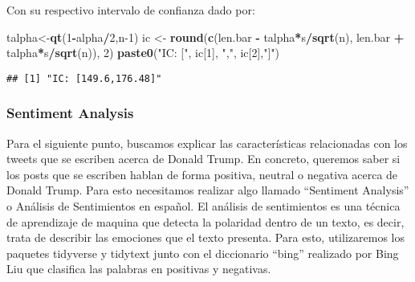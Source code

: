 \documentclass[
]{article}
\newenvironment{Shaded}{\begin{snugshade}}{\end{snugshade}}
\newcommand{\DecValTok}[1]{\textcolor[rgb]{0.00,0.00,0.81}{#1}}
\newcommand{\KeywordTok}[1]{\textcolor[rgb]{0.13,0.29,0.53}{\textbf{#1}}}
\newcommand{\NormalTok}[1]{#1}
\newcommand{\OperatorTok}[1]{\textcolor[rgb]{0.81,0.36,0.00}{\textbf{#1}}}
\newcommand{\StringTok}[1]{\textcolor[rgb]{0.31,0.60,0.02}{#1}}
\begin{document}
Con su respectivo intervalo de confianza dado por:

\begin{Shaded}
\begin{Highlighting}[]
\NormalTok{talpha<-}\KeywordTok{qt}\NormalTok{(}\DecValTok{1}\OperatorTok{-}\NormalTok{alpha}\OperatorTok{/}\DecValTok{2}\NormalTok{,n}\DecValTok{-1}\NormalTok{)}
\NormalTok{ic <-}\StringTok{ }\KeywordTok{round}\NormalTok{(}\KeywordTok{c}\NormalTok{(len.bar }\OperatorTok{-}\StringTok{ }\NormalTok{talpha}\OperatorTok{*}\NormalTok{s}\OperatorTok{/}\KeywordTok{sqrt}\NormalTok{(n), len.bar }\OperatorTok{+}\StringTok{ }\NormalTok{talpha}\OperatorTok{*}\NormalTok{s}\OperatorTok{/}\KeywordTok{sqrt}\NormalTok{(n)), }\DecValTok{2}\NormalTok{)}
\KeywordTok{paste0}\NormalTok{(}\StringTok{"IC: ["}\NormalTok{,}
\NormalTok{       ic[}\DecValTok{1}\NormalTok{], }\StringTok{","}\NormalTok{, ic[}\DecValTok{2}\NormalTok{],}\StringTok{"]"}\NormalTok{)}
\end{Highlighting}
\end{Shaded}

\begin{verbatim}
## [1] "IC: [149.6,176.48]"
\end{verbatim}

\hypertarget{sentiment-analysis}{%
\subsubsection{Sentiment Analysis}\label{sentiment-analysis}}

Para el siguiente punto, buscamos explicar las características
relacionadas con los tweets que se escriben acerca de Donald Trump. En
concreto, queremos saber si los posts que se escriben hablan de forma
positiva, neutral o negativa acerca de Donald Trump. Para esto
necesitamos realizar algo llamado ``Sentiment Analysis'' o Análisis de
Sentimientos en español. El análisis de sentimientos es una técnica de
aprendizaje de maquina que detecta la polaridad dentro de un texto, es
decir, trata de describir las emociones que el texto presenta. Para
esto, utilizaremos los paquetes tidyverse y tidytext junto con el
diccionario ``bing'' realizado por Bing Liu que clasifica las palabras
en positivas y negativas.
\end{document}
